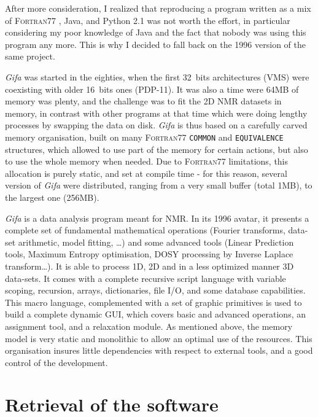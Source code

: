After more consideration, I realized that reproducing a program written
as a mix of F\textsc{ortran}77 , Java, and Python 2.1 was not worth the
effort, in particular considering my poor knowledge of Java and the fact
that nobody was using this program any more. This is why I decided to
fall back on the 1996 version of the same project.

\emph{Gifa} was started in the eighties, when the first 32~bits
architectures (VMS) were coexisting with older 16~bits ones (PDP-11). It
was also a time were 64MB of memory was plenty, and the challenge was to
fit the 2D NMR datasets in memory, in contrast with other programs at
that time which were doing lengthy processes by swapping the data on
disk. \emph{Gifa} is thus based on a carefully carved memory
organisation, built on many F\textsc{ortran}77 \texttt{COMMON} and
\texttt{EQUIVALENCE} structures, which allowed to use part of the memory
for certain actions, but also to use the whole memory when needed. Due
to F\textsc{ortran}77 limitations, this allocation is purely static, and
set at compile time - for this reason, several version of \emph{Gifa}
were distributed, ranging from a very small buffer (total 1MB), to the
largest one (256MB).

\emph{Gifa} is a data analysis program meant for NMR. In its 1996
avatar, it presents a complete set of fundamental mathematical
operations (Fourier transforms, data-set arithmetic, model fitting,
\ldots{}) and some advanced tools (Linear Prediction tools, Maximum
Entropy optimisation, DOSY processing by Inverse Laplace
transform\ldots{}). It is able to process 1D, 2D and in a less optimized
manner 3D data-sets. It comes with a complete recursive script language
with variable scoping, recursion, arrays, dictionaries, file I/O, and
some database capabilities. This macro language, complemented with a set
of graphic primitives is used to build a complete dynamic GUI, which
covers basic and advanced operations, an assignment tool, and a
relaxation module. As mentioned above, the memory model is very static
and monolithic to allow an optimal use of the resources. This
organisation insures little dependencies with respect to external tools,
and a good control of the development.

\hypertarget{recovering-the-software}{%
\section{Retrieval of the software}\label{recovering-the-software}}

